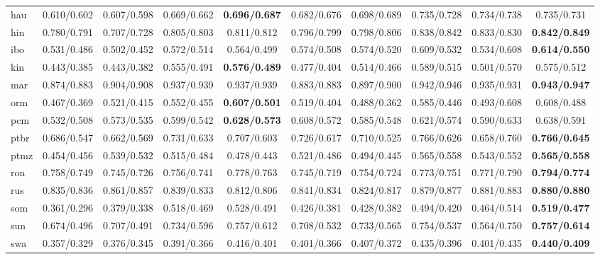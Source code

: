 \documentclass[a4paper,12pt]{extarticle}
\begin{document}
\begin{table}[!th]
\begin{center}
{\begin{tabular}{@{}lccccccccc@{}}
    hau & 0.610/0.602 & 0.607/0.598 & 0.669/0.662 & \textbf{0.696/0.687} & 0.682/0.676 & 0.698/0.689 & 0.735/0.728 & 0.734/0.738 & 0.735/0.731 \\
    hin & 0.780/0.791 & 0.707/0.728 & 0.805/0.803 & 0.811/0.812 & 0.796/0.799 & 0.798/0.806 & 0.838/0.842 & 0.833/0.830 & \textbf{0.842/0.849} \\
    ibo & 0.531/0.486 & 0.502/0.452 & 0.572/0.514 & 0.564/0.499 & 0.574/0.508 & 0.574/0.520 & 0.609/0.532 & 0.534/0.608 & \textbf{0.614/0.550} \\
    kin & 0.443/0.385 & 0.443/0.382 & 0.555/0.491 & \textbf{0.576/0.489} & 0.477/0.404 & 0.514/0.466 & 0.589/0.515 & 0.501/0.570 & 0.575/0.512 \\
    mar & 0.874/0.883 & 0.904/0.908 & 0.937/0.939 & 0.937/0.939 & 0.883/0.883 & 0.897/0.900 & 0.942/0.946 & 0.935/0.931 & \textbf{0.943/0.947} \\
    orm & 0.467/0.369 & 0.521/0.415 & 0.552/0.455 & \textbf{0.607/0.501} & 0.519/0.404 & 0.488/0.362 & 0.585/0.446 & 0.493/0.608 & 0.608/0.488 \\
    pcm & 0.532/0.508 & 0.573/0.535 & 0.599/0.542 & \textbf{0.628/0.573} & 0.608/0.572 & 0.585/0.548 & 0.621/0.574 & 0.590/0.633 & 0.638/0.591 \\
    ptbr & 0.686/0.547 & 0.662/0.569 & 0.731/0.633 & 0.707/0.603 & 0.726/0.617 & 0.710/0.525 & 0.766/0.626 & 0.658/0.760 & \textbf{0.766/0.645} \\
    ptmz & 0.454/0.456 & 0.539/0.532 & 0.515/0.484 & 0.478/0.443 & 0.521/0.486 & 0.494/0.445 & 0.565/0.558 & 0.543/0.552 & \textbf{0.565/0.558} \\
    ron & 0.758/0.749 & 0.745/0.726 & 0.756/0.741 & 0.778/0.763 & 0.745/0.719 & 0.754/0.724 & 0.773/0.751 & 0.771/0.790 & \textbf{0.794/0.774} \\
    rus & 0.835/0.836 & 0.861/0.857 & 0.839/0.833 & 0.812/0.806 & 0.841/0.834 & 0.824/0.817 & 0.879/0.877 & 0.881/0.883 & \textbf{0.880/0.880} \\
    som & 0.361/0.296 & 0.379/0.338 & 0.518/0.469 & 0.528/0.491 & 0.426/0.381 & 0.428/0.382 & 0.494/0.420 & 0.464/0.514 & \textbf{0.519/0.477} \\
    sun & 0.674/0.496 & 0.707/0.491 & 0.734/0.596 & 0.757/0.612 & 0.708/0.532 & 0.733/0.565 & 0.754/0.537 & 0.564/0.750 & \textbf{0.757/0.614} \\
    swa & 0.357/0.329 & 0.376/0.345 & 0.391/0.366 & 0.416/0.401 & 0.401/0.366 & 0.407/0.372 & 0.435/0.396 & 0.401/0.435 & \textbf{0.440/0.409} \\

\end{tabular}}
\end{center}
\end{table}
\end{document}

